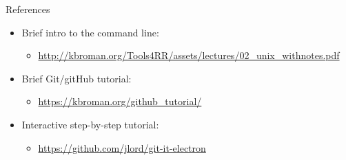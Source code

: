 \documentclass[12pt]{beamer}
\begin{document}
\begin{frame}{References}
\begin{itemize}
	\item Brief intro to the command line:
	\begin{itemize}
		\item  \url{http://kbroman.org/Tools4RR/assets/lectures/02_unix_withnotes.pdf}
	\end{itemize}
	\vspace{.6cm}
	\item Brief Git/gitHub tutorial:
\begin{itemize}
	\item   \url{https://kbroman.org/github_tutorial/}
\end{itemize}
	\vspace{.6cm}
	\item Interactive step-by-step tutorial:
\begin{itemize}
	\item   \url{https://github.com/jlord/git-it-electron}
\end{itemize}
\end{itemize}







\end{frame}
\end{document}
